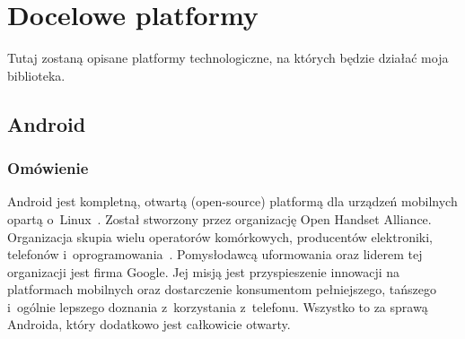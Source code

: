 %

\section{Docelowe platformy}
Tutaj zostaną opisane platformy technologiczne, na których będzie działać moja biblioteka.

\subsection{Android}
\label{android}

\subsubsection{Omówienie}
Android jest kompletną, otwartą (open-source) platformą dla urządzeń mobilnych opartą o~Linux~\cite{learning-android}. Został stworzony przez organizację Open Handset Alliance. Organizacja skupia wielu operatorów komórkowych, producentów elektroniki, telefonów i~oprogramowania~\cite{oha}. Pomysłodawcą uformowania oraz liderem tej organizacji jest firma Google. Jej misją jest przyspieszenie innowacji na platformach mobilnych oraz dostarczenie konsumentom pełniejszego, tańszego i~ogólnie lepszego doznania z~korzystania z~telefonu. Wszystko to za sprawą Androida, który dodatkowo jest całkowicie otwarty.


